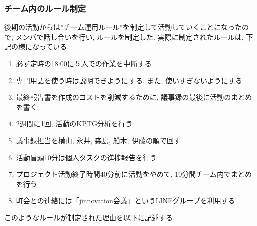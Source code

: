 \subsubsection{チーム内のルール制定}
後期の活動からは”チーム運用ルール”を制定して活動していくことになったので, メンバで話し合いを行い, ルールを制定した. 実際に制定されたルールは, 下記の様になっている.
\begin{enumerate}
    \item 必ず定時の18:00に５人での作業を中断する
    \item 専門用語を使う時は説明できようにする. また, 使いすぎないようにする
    \item 最終報告書を作成のコストを削減するために, 議事録の最後に活動のまとめを書く
    \item 2週間に1回, 活動のKPTG分析を行う
    \item 議事録担当を横山, 永井, 森島, 船木, 伊藤の順で回す
    \item 活動冒頭10分は個人タスクの進捗報告を行う
    \item プロジェクト活動終了時間40分前に活動をやめて, 10分間チーム内でまとめを行う
    \item 町会との連絡には「jinnovation会議」というLINEグループを利用する
\end{enumerate}
このようなルールが制定された理由を以下に記述する.
